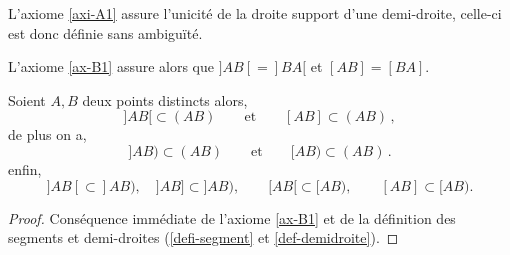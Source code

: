 \begin{rema}
    L'axiome \ref{axi-A1} assure l'unicité de la droite support d'une demi-droite, celle-ci est donc définie sans ambiguïté.
\end{rema}
\begin{rema}
    L'axiome \ref{ax-B1} assure alors que $]AB[=]BA[$ et $[AB]=[BA]$. 
\end{rema}
\begin{prop}\label{prop-inclusionsegmentdemidroite}
Soient $A,B$ deux points distincts alors,
\begin{equation*}
    ]AB[\subset (AB) \qquad \text{et} \qquad [AB]\subset (AB)\,,
\end{equation*}
de plus on a,
\begin{equation*}
   ]AB)  \subset (AB) \qquad \text{et} \qquad [AB)  \subset (AB)\,.
\end{equation*}
enfin,
\begin{equation*}
    ]AB[ \subset ]AB), \quad ]AB] \subset ]AB), \qquad [AB[ \subset [AB), \qquad [AB] \subset [AB).
\end{equation*}
\begin{proof}
    Conséquence immédiate de l'axiome \ref{ax-B1} et de la définition des segments et demi-droites (\ref{defi-segment} et \ref{def-demidroite}).
\end{proof}
\end{prop}
